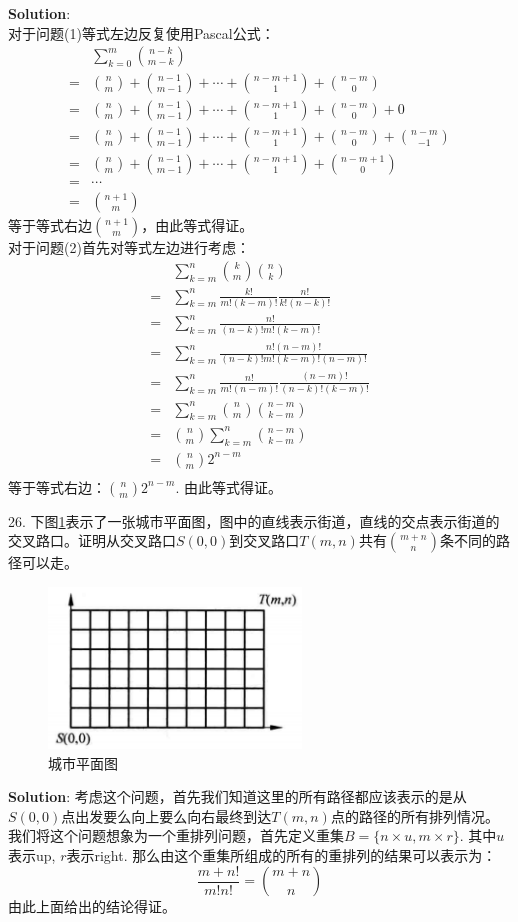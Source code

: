 \documentclass[a4paper]{ctexart}
\begin{document}
	 \textbf{Solution}: \\
	 对于问题(1)等式左边反复使用Pascal公式：
	 \[ 
	 \begin{aligned}
	  &\sum_{k=0}^{m}\binom{n-k}{m-k}\\
	  =& \binom{n}{m} +\binom{n-1}{m-1} + \cdots +\binom{n-m+1}{1}+\binom{n-m}{0}\\
	  =& \binom{n}{m} +\binom{n-1}{m-1} + \cdots +\binom{n-m+1}{1}+\binom{n-m}{0} + 0\\
	  =& \binom{n}{m} +\binom{n-1}{m-1} + \cdots +\binom{n-m+1}{1}+\binom{n-m}{0} + \binom{n-m}{-1}\\
	  =& \binom{n}{m} +\binom{n-1}{m-1} + \cdots +\binom{n-m+1}{1}+\binom{n-m+1}{0}\\
	  =& \cdots \\
	  =& \binom{n+1}{m}
	 \end{aligned}
	  \]
	  等于等式右边$\binom{n+1}{m}$，由此等式得证。\\
	  对于问题(2)首先对等式左边进行考虑：
	  \[ 
	  \begin{aligned}
	  &\sum_{k=m}^{n} \binom{k}{m}\binom{n}{k}\\
	  =&\sum_{k=m}^{n} \frac{k!}{m!(k-m)!} \frac{n!}{k!(n-k)!}\\
	  =&\sum_{k=m}^{n} \frac{n!}{(n-k)! m!(k-m)!}\\
	  =&\sum_{k=m}^{n} \frac{n! (n-m)!}{(n-k)! m!(k-m)!(n-m)!}\\
	  =& \sum_{k=m}^{n} \frac{n!}{m!(n-m)!}\frac{(n-m)!}{(n-k)!(k-m)!}\\
	  =& \sum_{k=m}^{n} \binom{n}{m} \binom{n-m}{k-m}\\
	  =&\binom{n}{m}\sum_{k=m}^{n} \binom{n-m}{k-m}\\
	  =&\binom{n}{m} 2^{n-m}\\
	  \end{aligned}
	   \]
	  等于等式右边：$\binom{n}{m}2^{n-m}$. 由此等式得证。
	  
	 26. 下图\ref{1}表示了一张城市平面图，图中的直线表示街道，直线的交点表示街道的交叉路口。证明从交叉路口$S(0,0)$到交叉路口$T(m,n)$共有$\binom{m+n}{n}$条不同的路径可以走。
	 \begin{figure}[t]
	 	\centering
	 	\includegraphics[width=0.6\textwidth]{problem-26.png}
	 	\caption{城市平面图}
	 	\label{1}
	 \end{figure}
 
    \textbf{Solution}:
	考虑这个问题，首先我们知道这里的所有路径都应该表示的是从$S(0,0)$点出发要么向上要么向右最终到达$T(m,n)$点的路径的所有排列情况。我们将这个问题想象为一个重排列问题，首先定义重集$B=\{n \times u,m\times r\}$. 其中$u$表示up, $r$表示right. 那么由这个重集所组成的所有的重排列的结果可以表示为：
	\[ \frac{m+n!}{m!n!} =\binom{m+n}{n}\]
	由此上面给出的结论得证。
 
\end{document}
